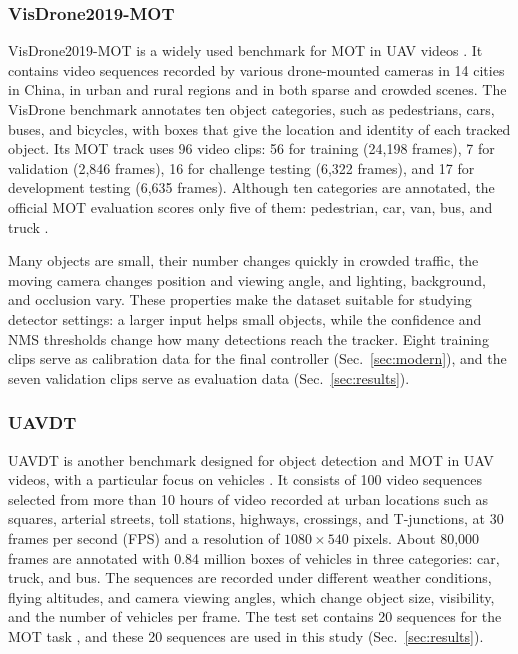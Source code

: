 \documentclass[journal]{new-aiaa}
\begin{document}
\subsubsection{VisDrone2019-MOT}
VisDrone2019-MOT is a widely used benchmark for MOT in UAV
videos \cite{zhu2022visdrone}. It contains video sequences recorded by various
drone-mounted cameras in 14 cities in China, in urban and rural regions and in
both sparse and crowded scenes. The VisDrone benchmark annotates ten object
categories, such as pedestrians, cars, buses, and bicycles, with boxes that
give the location and identity of each tracked object. Its MOT track uses
96 video clips: 56 for training (24,198 frames), 7 for validation (2,846
frames), 16 for challenge testing (6,322 frames), and 17 for development
testing (6,635 frames). Although ten categories are annotated, the official
MOT evaluation scores only five of them: pedestrian, car, van, bus, and truck
\cite{zhu2022visdrone}.

Many objects are small, their number changes quickly in crowded traffic, the
moving camera changes position and viewing angle, and lighting, background,
and occlusion vary. These properties make the dataset suitable for studying
detector settings: a larger input helps small objects, while the confidence
and NMS thresholds change how many detections reach the tracker. Eight
training clips serve as calibration data for the final controller
(Sec.~\ref{sec:modern}), and the seven validation clips serve as evaluation
data (Sec.~\ref{sec:results}).

\subsubsection{UAVDT}
UAVDT is another benchmark designed for object detection and MOT in UAV
videos, with a particular focus on vehicles \cite{du2018uavdt}.
It consists of 100 video sequences selected from more than 10 hours of video
recorded at urban locations such as squares, arterial streets, toll stations,
highways, crossings, and T-junctions, at 30 frames per second (FPS) and a resolution
of $1080\times540$ pixels. About 80,000 frames are annotated with 0.84 million
boxes of vehicles in three categories: car, truck, and bus. The sequences are
recorded under different weather conditions, flying altitudes, and camera
viewing angles, which change object size, visibility, and the number of
vehicles per frame. The test set contains 20 sequences for the MOT task
\cite{du2018uavdt}, and these 20 sequences are used in this study
(Sec.~\ref{sec:results}).
\end{document}
